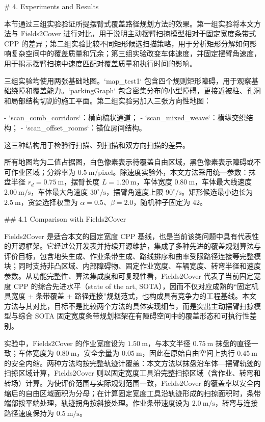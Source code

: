 # 4. Experiments and Results

  

本节通过三组实验验证所提摆臂式覆盖路径规划方法的效果。第一组实验将本文方法与 Fields2Cover 进行对比，用于说明主动摆臂扫掠模型相对于固定宽度条带式 CPP 的差异；第二组实验比较不同矩形候选扫描策略，用于分析矩形分解如何影响复杂空间中的覆盖质量和冗余；第三组实验改变车体速度，并固定摆臂角速度，用于揭示摆臂扫掠中速度匹配对覆盖质量和执行时间的影响。

  

三组实验均使用两张基础地图。`map_test1` 包含四个规则矩形障碍，用于观察基础绕障和覆盖能力。`parkingGraph` 包含密集分布的小型障碍，更接近被柱、孔洞和局部结构切割的施工平面。第二组实验另加入三张方向性地图：

- `scan_comb_corridors`：横向梳状通道；
- `scan_mixed_weave`：横纵交织结构；
- `scan_offset_rooms`：错位房间结构。

这三种结构用于检验行扫描、列扫描和双方向扫描的差异。

  

所有地图均为二值占据图，白色像素表示待覆盖自由区域，黑色像素表示障碍或不可作业区域；分辨率为 $0.5\ \mathrm{m/pixel}$。除速度实验外，本文方法采用统一参数：抹盘半径 $r_d=0.75\ \mathrm{m}$，摆臂长度 $L=1.20\ \mathrm{m}$，车体宽度 $0.80\ \mathrm{m}$，车体最大线速度 $2.00\ \mathrm{m/s}$，车体最大角速度 $30^\circ/\mathrm{s}$，摆臂角速度上限 $90^\circ/\mathrm{s}$。矩形候选最小边长为 $2.5\ \mathrm{m}$，贪婪选择权重为 $\alpha=0.5$、$\beta=2.0$，随机种子固定为 42。



## 4.1 Comparison with Fields2Cover

  

Fields2Cover 是适合本文的固定宽度 CPP 基线，也是当前该类问题中具有代表性的开源框架。它经过公开发表并持续开源维护，集成了多种先进的覆盖规划算法与评价目标，包含地头生成、作业条带生成、路线排序和曲率受限路径连接等完整模块；同时支持非凸区域、内部障碍物、固定作业宽度、车辆宽度、转弯半径和速度参数。从功能完整性、算法集成度和可复现性看，Fields2Cover 代表了当前固定宽度 CPP 的综合先进水平（state of the art, SOTA），因而不仅对应成熟的“固定机具宽度 + 条带覆盖 + 路径连接”规划范式，也构成具有竞争力的工程基线。本文方法与其对比，目标不是比较两个方法的具体实现细节，而是突出主动摆臂扫掠模型与综合 SOTA 固定宽度条带规划框架在有障碍空间中的覆盖形态和可执行性差别。

  

实验中，Fields2Cover 的作业宽度设为 $1.50\ \mathrm{m}$，与本文半径 $0.75\ \mathrm{m}$ 抹盘的直径一致；车体宽度为 $0.80\ \mathrm{m}$，安全余量为 $0.05\ \mathrm{m}$，因此在原始自由空间上执行 $0.45\ \mathrm{m}$ 的安全内缩。两种方法均按完整轨迹计覆盖：本文方法以抹盘沿车体—摆臂轨迹的扫掠区域计算，Fields2Cover 则以固定宽度工具沿完整扫掠区域（含作业、转弯和转场）计算。为使评价范围与实际规划范围一致，Fields2Cover 的覆盖率以安全内缩后的自由区域面积为分母；在计算固定宽度工具沿轨迹形成的扫掠面积时，条带端部按平端处理，轨迹拐角按斜接处理。作业条带速度设为 $2.0\ \mathrm{m/s}$，转弯与连接路径速度保持为 $0.5\ \mathrm{m/s}$。

